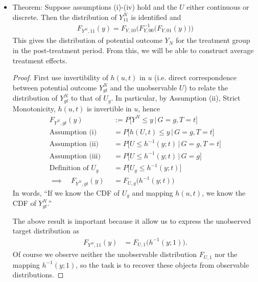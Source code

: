 \documentclass[12pt]{article}
\theoremstyle{plain}
\theoremstyle{definition}
\theoremstyle{remark}
\begin{document}
\begin{itemize}
  \item
    Theorem:
    Suppose assumptions (i)-(iv) hold and the $U$ either continuous or
    discrete. Then the distribution of $Y_{11}^N$ is identified and
    \begin{align*}
      F_{Y^N,11}(y)
      =
      F_{Y,10}\big(
        F_{Y,00}^{-1}\big(
        F_{Y,01}(y)
        \big)
      \big)
    \end{align*}
    This gives the distribution of potential outcome $Y_N$ for the
    treatment group in the post-treatment period. From this,
    we will be able to construct average treatment effects.
    \begin{proof}
    First use invertibility of $h(u,t)$ in $u$ (i.e. direct
    correspondence between potential outcome $Y^N_{gt}$ and the
    unobservable $U$) to relate the distribution of $Y^N_{gt}$ to that
    of $U_g$.
    In particular, by Assumption (ii), Strict Monotonicity, $h(u,t)$ is
    invertible in $u$, hence
    \begin{align*}
      F_{Y^N,gt}(y)
      &:=
      P\big[
        Y^N \leq y \,|\, G=g,T=t
      \big]
      \\
      \text{Assumption (i)}\quad
      &=
      P\big[
        h(U,t) \leq y \,|\, G=g,T=t
      \big]
      \\
      \text{Assumption (ii)}\quad
      &=
      P\big[
        U \leq h^{-1}(y;t) \,|\, G=g,T=t
      \big]
      \\
      \text{Assumption (iii)}\quad
      &=
      P\big[
        U \leq h^{-1}(y;t) \,|\, G=g
      \big]
      \\
      \text{Definition of $U_g$}\quad
      &=
      P\big[
        U_g \leq h^{-1}(y;t)
      \big]
      \\
      \implies\quad
      F_{Y^N,gt}(y)
      &=
      F_{U,g}\big(h^{-1}(y;t)\big)
    \end{align*}
    In words,
    ``If we know the CDF of $U_g$ and mapping $h(u,t)$, we know the
    CDF of $Y^N_{gt}$.''

    The above result is important because it allow us to express the
    unobserved target distribution as
    \begin{align}
      F_{Y^N,11}(y)
      &=
      F_{U,1}\big(h^{-1}(y;1)\big)
      .
      \label{cicid}
    \end{align}
    Of course we observe neither the unobservable distribution
    $F_{U,1}$ nor the mapping $h^{-1}(y;1)$, so the task is to recover
    these objects from observable distributions.


\end{proof}
\end{itemize}
\end{document}
